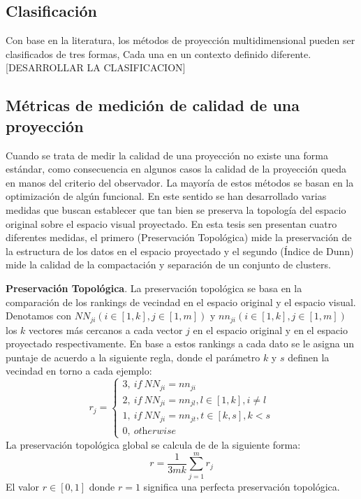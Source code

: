 \subsection{Clasificación}
Con base en la literatura, los métodos de proyección multidimensional pueden ser clasificados de tres formas, Cada una en un contexto  definido diferente. \textcolor[rgb]{0.2,0.8,0.2}{[DESARROLLAR LA CLASIFICACION]}

\subsection{Métricas de medición de calidad de una proyección}
Cuando se trata de medir la calidad de una proyección no existe una forma estándar, como consecuencia en algunos casos la calidad de la proyección queda en manos del criterio del observador. La mayoría de estos métodos se basan en la optimización de algún funcional. En este sentido se han desarrollado varias medidas que buscan establecer que tan bien se preserva la topología del espacio original sobre el espacio visual proyectado. En esta tesis sen presentan cuatro diferentes medidas, el primero (Preservación Topológica) mide la preservación de la estructura de los datos en el espacio proyectado y el segundo (Índice de Dunn) mide la calidad de la compactación y separación de un conjunto de clusters.

\textbf{Preservación Topológica}. La preservación topológica \cite{konig2000interactive} se basa en la comparación de los rankings de vecindad en el espacio original y el espacio visual. Denotamos con $NN_{ji}(i\in[1,k], j\in[1,m])$ y
$nn_{ji}(i\in[1,k], j\in[1,m])$ los $k$ vectores más cercanos a cada vector $j$ en el espacio original y en el espacio proyectado respectivamente. En base a estos rankings a cada dato se le asigna un puntaje de acuerdo a la siguiente regla, donde el parámetro $k$ y $s$ definen la vecindad en torno a cada ejemplo:
 \begin{equation}
	r_{j}=\left\{
                \begin{array}{ll}
									3,~if~NN_{ji} = nn_{ji}\\
									2,~if~NN_{ji} = nn_{jl}, l\in[1,k],i\neq l\\
									1,~if~NN_{ji} = nn_{jt}, t\in[k,s],k<s\\
									0,~\textit{otherwise}
                \end{array}\right.
		\end{equation}
La preservación topológica global se calcula de de la siguiente forma:
\begin{equation}
r=\frac{1}{3mk}\sum^{m}_{j=1}r_j
\end{equation}  		
El valor $r \in [0,1]$ donde  $r=1$ significa una perfecta preservación topológica.

